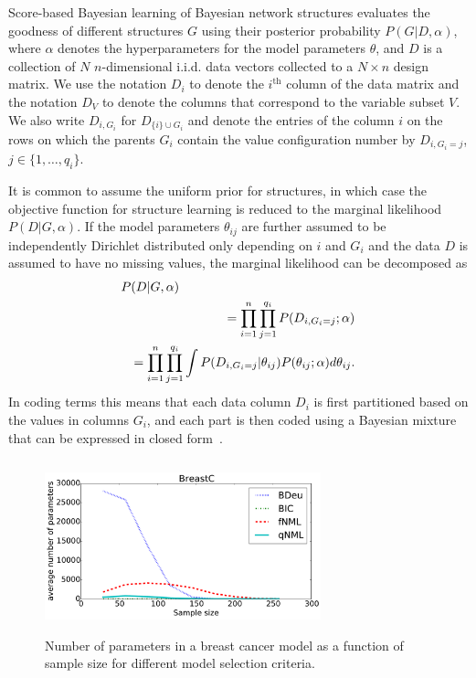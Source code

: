 Score-based Bayesian learning of Bayesian network structures evaluates the goodness of different structures $G$ using their
posterior probability $P(G|D,\alpha)$, where $\alpha$ denotes the
hyperparameters for the model parameters $\theta$, and $D$ is a
collection of $N$ $n$\nobreakdash-dimensional i.i.d. data vectors
collected to a $N\times n$ design matrix. We use the notation $D_i$ to
denote the $i^\text{th}$ column of the data matrix and the notation $D_V$ to denote
the columns that correspond to the variable subset $V$. We also write
$D_{i,G_i}$ for $D_{\{i\}\cup G_i}$ and denote the entries of the
column $i$ on the rows on which the parents $G_i$ contain the value
configuration number by $D_{i,G_i=j}$, $j\in\{1,\ldots,q_i\}$.

It is common to assume the uniform prior for structures, in which case
the objective function for structure learning is reduced to the
marginal likelihood $P(D|G,\alpha)$.  If the model parameters
$\theta_{ij}$ are further assumed to be independently Dirichlet
distributed only depending on $i$ and $G_{i}$ and the data $D$ is
assumed to have no missing values, the marginal likelihood can be
decomposed as
\begin{eqnarray}
\label{eqn:bayesmix}
\lefteqn{P(D|G,\alpha)}\nonumber\\
&&=\prod_{i=1}^{n}\prod_{j=1}^{q_i}P(D_{i,G_i=j};\alpha)\nonumber\\
&&=\prod_{i=1}^{n}\prod_{j=1}^{q_i}\int P(D_{i,G_i=j}|\theta_{ij})P(\theta_{ij};\alpha) d\theta_{ij}.
\end{eqnarray}
In coding terms this means that each data column $D_i$ is first
partitioned based on the values in columns $G_i$, and each part is
then coded using a Bayesian mixture that can be expressed in closed
form~\cite{Bunt91, Heck95}. 

\begin{figure}
\centering
\includegraphics[width=8cm,height=5cm]{qNML_images/breast_cancer_npmean.pdf}
\caption{Number of parameters in a breast cancer model as a function
  of sample size for different model selection criteria.}
\label{fig:bcnpmean}
\end{figure}


